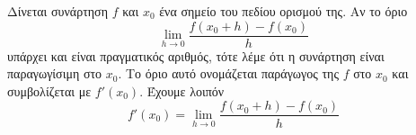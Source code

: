 Δίνεται συνάρτηση $ f $ και $ x_0 $ ένα σημείο του πεδίου ορισμού της. Αν το όριο
\[ \lim_{h\to 0}{\frac{f(x_0+h)-f(x_0)}{h}} \]
υπάρχει και είναι πραγματικός αριθμός, τότε λέμε ότι η συνάρτηση είναι παραγωγίσιμη στο $ x_0 $. Το όριο αυτό ονομάζεται παράγωγος της $ f $ στο $ x_0 $ και συμβολίζεται με $ f'(x_0) $. Έχουμε λοιπόν
\[ f'(x_0)=\lim_{h\to 0}{\frac{f(x_0+h)-f(x_0)}{h}} \]
